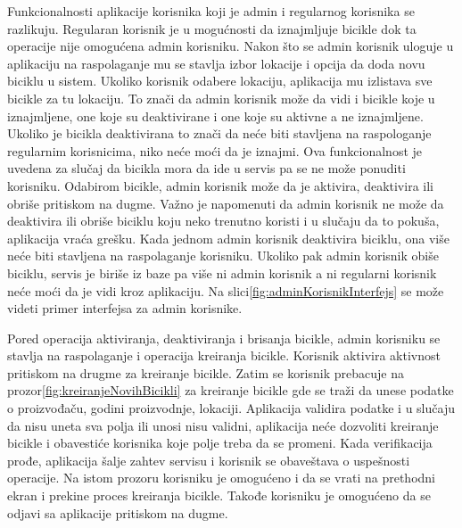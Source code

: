 \documentclass[12pt,oneside]{memoir}
\begin{document}
 
Funkcionalnosti aplikacije korisnika koji je admin i regularnog korisnika se razlikuju. Regularan korisnik je u mogućnosti da iznajmljuje bicikle dok ta operacije nije omogućena admin korisniku. Nakon što se admin korisnik uloguje u aplikaciju na raspolaganje mu se stavlja izbor lokacije i opcija da doda novu biciklu u sistem. Ukoliko korisnik odabere lokaciju, aplikacija mu izlistava sve bicikle za tu lokaciju. To znači da admin korisnik može da vidi i bicikle koje u iznajmljene, one koje su deaktivirane i one koje su aktivne a ne iznajmljene. Ukoliko je bicikla deaktivirana to znači da neće biti stavljena na raspologanje regularnim korisnicima, niko neće moći da je iznajmi. Ova funkcionalnost je uvedena za slučaj da bicikla mora da ide u servis pa se ne može ponuditi korisniku. Odabirom bicikle, admin korisnik može da je aktivira, deaktivira ili obriše pritiskom na dugme. Važno je napomenuti da admin korisnik ne može da deaktivira ili obriše biciklu koju neko trenutno koristi i u slučaju da to pokuša, aplikacija vraća grešku. Kada jednom admin korisnik deaktivira biciklu, ona više neće biti stavljena na raspolaganje korisniku. Ukoliko pak admin korisnik obiše biciklu, servis je biriše iz baze pa više ni admin korisnik a ni regularni korisnik neće moći da je vidi kroz aplikaciju. Na slici\ref{fig:adminKorisnikInterfejs} se može videti primer interfejsa za admin korisnike.


Pored operacija aktiviranja, deaktiviranja i brisanja bicikle, admin korisniku se stavlja na raspolaganje i operacija kreiranja bicikle. Korisnik aktivira aktivnost pritiskom na drugme za kreiranje bicikle. Zatim se korisnik prebacuje na prozor\ref{fig:kreiranjeNovihBicikli} za kreiranje bicikle gde se traži da unese podatke o proizvođaču, godini proizvodnje, lokaciji. Aplikacija validira podatke i u slučaju da nisu uneta sva polja ili unosi nisu validni, aplikacija neće dozvoliti kreiranje bicikle i obavestiće korisnika koje polje treba da se promeni. Kada verifikacija prođe, aplikacija šalje zahtev servisu i korisnik se obaveštava o uspešnosti operacije. Na istom prozoru korisniku je omogućeno i da se vrati na prethodni ekran i prekine proces kreiranja bicikle. Takođe korisniku je omogućeno da se odjavi sa aplikacije pritiskom na dugme.
 
\end{document}
